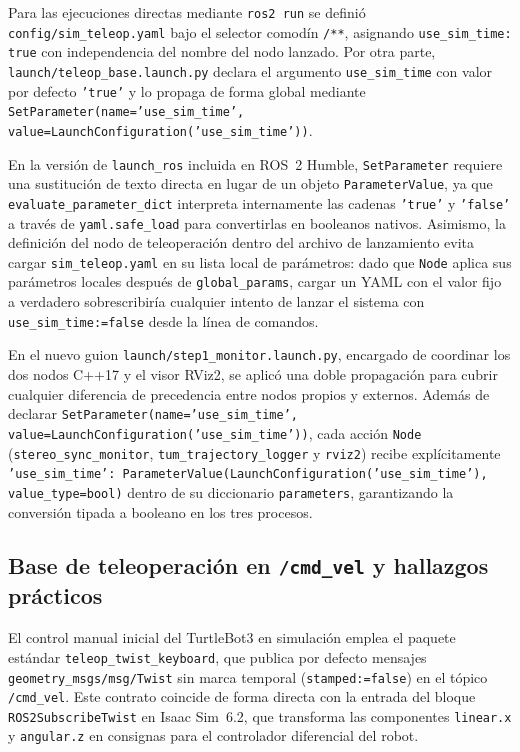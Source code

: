 Para las ejecuciones directas mediante \texttt{ros2 run} se definió \texttt{config/sim\_teleop.yaml} bajo el selector comodín \texttt{/**}, asignando \texttt{use\_sim\_time: true} con independencia del nombre del nodo lanzado. Por otra parte, \texttt{launch/teleop\_base.launch.py} declara el argumento \texttt{use\_sim\_time} con valor por defecto \texttt{'true'} y lo propaga de forma global mediante \texttt{SetParameter(name='use\_sim\_time', value=LaunchConfiguration('use\_sim\_time'))}.

En la versión de \texttt{launch\_ros} incluida en ROS~2 Humble, \texttt{SetParameter} requiere una sustitución de texto directa en lugar de un objeto \texttt{ParameterValue}, ya que \texttt{evaluate\_parameter\_dict} interpreta internamente las cadenas \texttt{'true'} y \texttt{'false'} a través de \texttt{yaml.safe\_load} para convertirlas en booleanos nativos. Asimismo, la definición del nodo de teleoperación dentro del archivo de lanzamiento evita cargar \texttt{sim\_teleop.yaml} en su lista local de parámetros: dado que \texttt{Node} aplica sus parámetros locales después de \texttt{global\_params}, cargar un YAML con el valor fijo a verdadero sobrescribiría cualquier intento de lanzar el sistema con \texttt{use\_sim\_time:=false} desde la línea de comandos.

En el nuevo guion \texttt{launch/step1\_monitor.launch.py}, encargado de coordinar los dos nodos C++17 y el visor RViz2, se aplicó una doble propagación para cubrir cualquier diferencia de precedencia entre nodos propios y externos. Además de declarar \texttt{SetParameter(name='use\_sim\_time', value=LaunchConfiguration('use\_sim\_time'))}, cada acción \texttt{Node} (\texttt{stereo\_sync\_monitor}, \texttt{tum\_trajectory\_logger} y \texttt{rviz2}) recibe explícitamente \texttt{'use\_sim\_time': ParameterValue(LaunchConfiguration('use\_sim\_time'), value\_type=bool)} dentro de su diccionario \texttt{parameters}, garantizando la conversión tipada a booleano en los tres procesos.

\subsection{Base de teleoperación en \texttt{/cmd\_vel} y hallazgos prácticos}
\label{sec:teleop_cmd_vel}

El control manual inicial del TurtleBot3 en simulación emplea el paquete estándar \texttt{teleop\_twist\_keyboard}, que publica por defecto mensajes \texttt{geometry\_msgs/msg/Twist} sin marca temporal (\texttt{stamped:=false}) en el tópico \texttt{/cmd\_vel}. Este contrato coincide de forma directa con la entrada del bloque \texttt{ROS2SubscribeTwist} en Isaac Sim~6.2, que transforma las componentes \texttt{linear.x} y \texttt{angular.z} en consignas para el controlador diferencial del robot.

